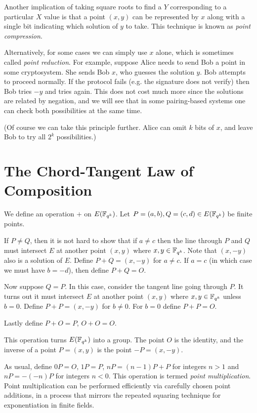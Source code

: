 Another implication of taking square roots to find a $Y$ corresponding to
a particular $X$ value is that
a point $(x,y)$ can be represented by $x$ along with a single bit indicating
which solution of $y$ to take. This technique is known as \emph{point
compression}.

Alternatively, for some cases we can simply use $x$ alone, which
is sometimes called \emph{point reduction}. For example,
suppose Alice needs to send Bob a point in some cryptosystem. She sends
Bob $x$, who guesses the solution $y$. Bob attempts to proceed normally.
If the protocol fails (e.g. the signature does not verify) then Bob tries
$-y$ and tries again. This does not cost much more since the solutions are
related by negation, and we will see that in some pairing-based systems
one can check both possibilities at the same time.

(Of course we can take this principle further. Alice can
omit $k$ bits of $x$, and leave Bob to try all $2^k$ possibilities.)

\section {The Chord-Tangent Law of Composition}

We define an operation $+$ on $E(\mathbb{F}_{q^k})$.
Let $P = (a,b), Q = (c,d) \in E(\mathbb{F}_{q^k})$ be finite points.

If $P \ne Q$, then it is not hard to show that if $a \ne c$
then the line through $P$ and $Q$ must intersect $E$ at another point
$(x,y)$ where $x, y\in \mathbb{F}_{q^k}$. Note that $(x,-y)$ also is a solution of $E$.
Define $P + Q = (x, -y)$ for $a \ne c$.
If $a = c$ (in which case we must have $b = -d$),
then define $P + Q = O$.

Now suppose $Q = P$. In this case, consider the tangent line going through
$P$. It turns out it must intersect $E$ at another point $(x,y)$ where
$x,y\in\mathbb{F}_{q^k}$ unless $b = 0$. Define $P + P = (x, -y)$ for $b \ne 0$.
For $b = 0$ define $P + P = O$.

Lastly define $P + O = P$, $O + O = O$.

This operation turns $E(\mathbb{F}_{q^k})$ into a group.
The point $O$ is the identity, and the inverse
of a point $P = (x,y)$ is the point $-P = (x,-y)$.

As usual, define $0 P = O$, $1 P = P$,
$n P = (n-1)P + P$ for integers $n > 1$ and $n P = -(-n)P$ for integers
$n < 0$.
This operation is termed \emph{point multiplication}.
Point multiplication can be performed efficiently via carefully
chosen point additions, in a process that mirrors the repeated
squaring technique for exponentiation in finite fields.

